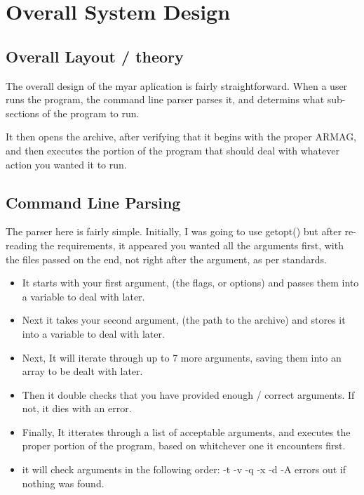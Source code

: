 \documentclass[letterpaper,10pt,titlepage]{article}
\begin{document}
\tableofcontents

\section{Overall System Design}

\subsection{Overall Layout / theory}

The overall design of the myar aplication is fairly straightforward.  When a user runs the program, the command line parser parses it, and determins what sub-sections of the program to run.

It then opens the archive, after verifying that it begins with the proper ARMAG, and then executes the portion of the program that should deal with whatever action you wanted it to run.

\subsection{Command Line Parsing}

The parser here is fairly simple.  Initially, I was going to use getopt() but after re-reading the requirements, it appeared you wanted all the arguments first, with the files passed on the end, not right after the argument, as per standards.

\begin{itemize}
\item It starts with your first argument, (the flags, or options) and passes them into a variable to deal with later.
\item Next it takes your second argument, (the path to the archive) and stores it into a variable to deal with later.
\item Next, It will iterate through up to 7 more arguments, saving them into an array to be dealt with later.
\item Then it double checks that you have provided enough / correct arguments.  If not, it dies with an error.
\item Finally, It itterates through a list of acceptable arguments, and executes the proper portion of the program, based on whitchever one it encounters first.
\item it will check arguments in the following order:
\subitem -t
\subitem -v
\subitem -q
\subitem -x
\subitem -d
\subitem -A
\subitem errors out if nothing was found.
\end{itemize}
\end{document}
